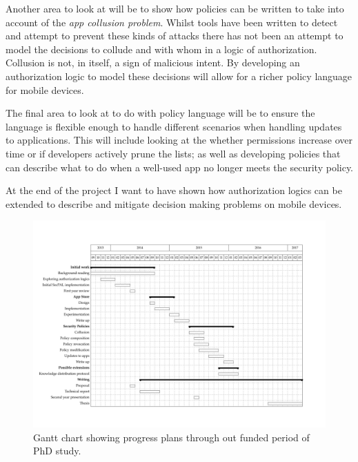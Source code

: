 \documentclass[a4paper,sfsidenotes]{tufte-book}
\begin{document}
Another area to look at will be to show how policies can be written to take into
account of the \emph{app collusion problem}.  Whilst tools have been written to
detect and attempt to prevent these kinds of attacks there has not been an
attempt to model the decisions to collude and with whom in a logic of
authorization.  Collusion is not, in itself, a sign of malicious intent.  By
developing an authorization logic to model these decisions will allow for a
richer policy language for mobile devices.

The final area to look at to do with policy language will be to ensure the language
is flexible enough to handle different scenarios when handling updates to
applications.  This will include looking at the whether permissions increase
over time or if developers actively prune the lists; as well as developing
policies that can describe what to do when a well-used app no longer meets the
security policy.


At the end of the project I want to have shown how authorization logics can be
extended to describe and mitigate decision making problems on mobile devices.

\begin{figure}\label{fig:gantt}
  \includegraphics[width=1.4\linewidth,angle=90]{gantt.pdf}
  \caption{Gantt chart showing progress plans through out funded period of PhD
  study.}
\end{figure}



\appendix

\end{document}
